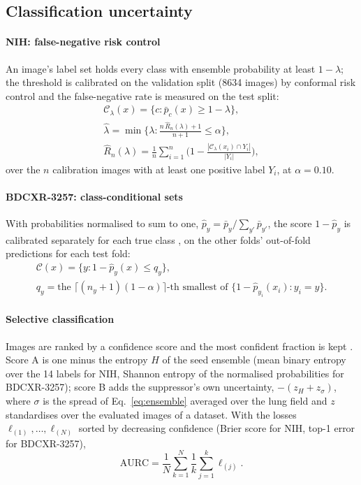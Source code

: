 \subsection{Classification uncertainty}
\label{sec:cls_uq}
\paragraph{NIH: false-negative risk control} An image's label set holds every class with ensemble probability at least $1-\lambda$; the
threshold is calibrated on the validation split (\num{8634} images) by conformal risk control \citep{angelopoulos2022crc} and the
false-negative rate is measured on the test split:
\begin{equation}
\begin{gathered}
\mathcal{C}_\lambda(x)=\{c:\bar p_c(x)\ge1-\lambda\},\\
\hat\lambda=\min\Big\{\lambda:\frac{n\,\hat R_n(\lambda)+1}{n+1}\le\alpha\Big\},\\
\hat R_n(\lambda)=\frac1n\sum_{i=1}^{n}\Big(1-\frac{|\mathcal{C}_\lambda(x_i)\cap Y_i|}{|Y_i|}\Big),
\end{gathered}
\label{eq:crc}
\end{equation}
over the $n$ calibration images with at least one positive label $Y_i$, at $\alpha=0.10$.
\paragraph{BDCXR-3257: class-conditional sets} With probabilities normalised to sum to one, $\hat p_y=\bar p_y/\sum_{y'}\bar p_{y'}$, the score
$1-\hat p_y$ is calibrated separately for each true class \citep{vovk2005algorithmic}, on the other folds' out-of-fold predictions for each
test fold:
\begin{equation}
\begin{gathered}
\mathcal{C}(x)=\{y:1-\hat p_y(x)\le q_y\},\\
q_y=\text{the }\lceil (n_y+1)(1-\alpha)\rceil\text{-th smallest of }\{1-\hat p_{y_i}(x_i):y_i=y\}.
\end{gathered}
\label{eq:mondriansets}
\end{equation}
\paragraph{Selective classification} Images are ranked by a confidence score and the most confident fraction is kept
\citep{geifman2017selective,geifman2019bias}. Score A is one minus the entropy $H$ of the seed ensemble (mean binary entropy over the 14 labels
for NIH, Shannon entropy of the normalised probabilities for BDCXR-3257); score B adds the suppressor's own uncertainty,
$-(z_H+z_\sigma)$, where $\sigma$ is the spread of Eq.~\eqref{eq:ensemble} averaged over the lung field and $z$ standardises over the evaluated
images of a dataset. With the losses $\ell_{(1)},\dots,\ell_{(N)}$ sorted by decreasing confidence (Brier score for NIH, top-1 error for
BDCXR-3257),
\begin{equation}
\mathrm{AURC}=\frac1N\sum_{k=1}^{N}\frac1k\sum_{j=1}^{k}\ell_{(j)}.
\label{eq:aurc}
\end{equation}
